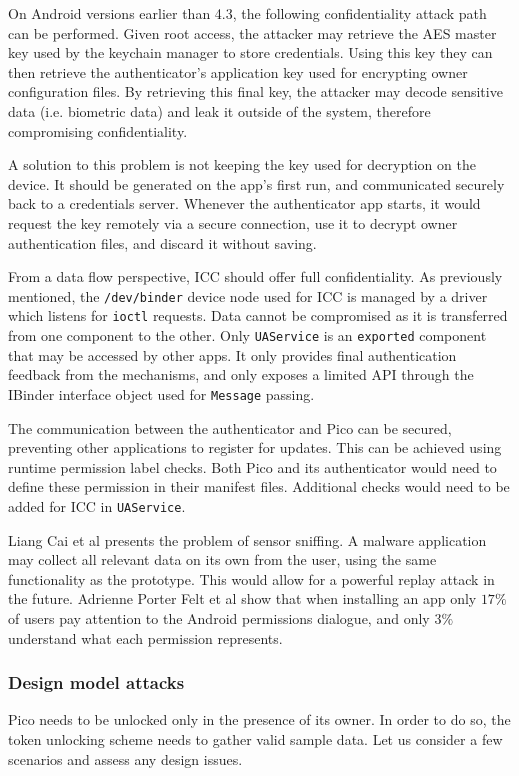 On Android versions earlier than 4.3, the following confidentiality attack path can be performed. Given root access, the attacker may retrieve the AES master key used by the keychain manager to store credentials. Using this key they can then retrieve the authenticator's application key used for encrypting owner configuration files. By retrieving this final key, the attacker may decode sensitive data (i.e. biometric data) and leak it outside of the system, therefore compromising confidentiality.

A solution to this problem is not keeping the key used for decryption on the device. It should be generated on the app's first run, and communicated securely back to a credentials server. Whenever the authenticator app starts, it would request the key remotely via a secure connection, use it to decrypt owner authentication files, and discard it without saving.

From a data flow perspective, ICC should offer full confidentiality. As previously mentioned, the {\tt /dev/binder} device node used for ICC is managed by a driver which listens for {\tt ioctl} requests. Data cannot be compromised as it is transferred from one component to the other. Only {\tt UAService} is an {\tt exported} component that may be accessed by other apps. It only provides final authentication feedback from the mechanisms, and only exposes a limited API through the IBinder interface object used for {\tt Message} passing.

The communication between the authenticator and Pico can be secured, preventing other applications to register for updates. This can be achieved using runtime permission label checks. Both Pico and its authenticator would need to define these permission in their manifest files. Additional checks would need to be added for ICC in {\tt UAService}.

Liang Cai et al \cite{cai2009defending} presents the problem of sensor sniffing. A malware application may collect all relevant data on its own from the user, using the same functionality as the prototype. This would allow for a powerful replay attack in the future. Adrienne Porter Felt et al \cite{felt2012android} show that when installing an app only $17\%$ of users pay attention to the Android permissions dialogue, and only $3\%$ understand what each permission represents.

\subsubsection*{Design model attacks}
\label{secdesignattacks}
Pico needs to be unlocked only in the presence of its owner. In order to do so, the token unlocking scheme needs to gather valid sample data. Let us consider a few scenarios and assess any design issues.
 
